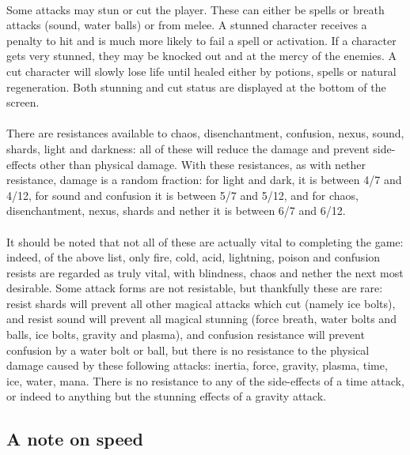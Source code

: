 \paragraph{}Some attacks may stun or cut the player. These can either be spells or
breath attacks (sound, water balls) or from melee. A stunned character
receives a penalty to hit and is much more likely to fail a spell or
activation. If a character gets very stunned, they may be knocked out
and at the mercy of the enemies. A cut character will slowly lose life
until healed either by potions, spells or natural regeneration. Both
stunning and cut status are displayed at the bottom of the screen.

\paragraph{}There are resistances available to chaos, disenchantment, confusion, nexus,
sound, shards, light and darkness: all of these will reduce the damage and
prevent side-effects other than physical damage. With these resistances, as
with nether resistance, damage is a random fraction: for light and dark, it
is between 4/7 and 4/12, for sound and confusion it is between 5/7 and 5/12,
and for chaos, disenchantment, nexus, shards and nether it is between 6/7
and 6/12.

\paragraph{}It should be noted that not all of these are actually vital to completing
the game: indeed, of the above list, only fire, cold, acid, lightning, poison
and confusion resists are regarded as truly vital, with blindness, chaos and
nether the next most desirable. Some attack forms are not resistable, but
thankfully these are rare: resist shards will prevent all other magical
attacks which cut (namely ice bolts), and resist sound will prevent all
magical stunning (force breath, water bolts and balls, ice bolts, gravity and
plasma), and confusion resistance will prevent confusion by a water bolt or
ball, but there is no resistance to the physical damage caused by these
following attacks: inertia, force, gravity, plasma, time, ice, water, mana.
There is no resistance to any of the side-effects of a time attack, or indeed
to anything but the stunning effects of a gravity attack.


\subsection{A note on speed}
